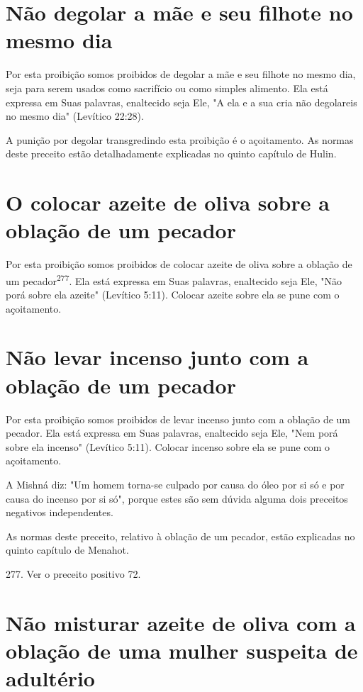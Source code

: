 \begin{itemize}
\begin{enumrate}
\begin{itemize}
\begin{itemize}
\begin{itemize}
\section{Não degolar a mãe e seu filhote no mesmo dia}

Por esta proibição somos proibidos de degolar a mãe e seu filhote no
mesmo dia, seja para serem usados como sacrifício ou como simples
alimento. Ela está expressa em Suas palavras, enaltecido seja Ele, "A
ela e a sua cria não degolareis no mesmo dia" (Levítico 22:28).

A punição por degolar transgredindo esta proibição é o açoitamento. As
normas deste preceito estão detalhadamente explicadas no quin­to
capítulo de Hulin.


\section{O colocar azeite de oliva sobre a oblação de um pecador}

Por esta proibição somos proibidos de colocar azeite de oliva sobre a
oblação de um pecador\textsuperscript{277}. Ela está expressa em Suas
palavras, enaltecido se­ja Ele, "Não porá sobre ela azeite" (Levítico
5:11). Colocar azeite sobre ela se pune com o açoitamento.


\section{Não levar incenso junto com a oblação de um pecador}


Por esta proibição somos proibidos de levar incenso junto com a oblação
de um pecador. Ela está expressa em Suas palavras, enaltecido seja Ele,
"Nem porá sobre ela incenso" (Levítico 5:11). Colocar incenso sobre ela
se pu­ne com o açoitamento.

A Mishná diz: "Um homem torna-se culpado por causa do óleo por si só e
por causa do incenso por si só", porque estes são sem dúvida alguma dois
preceitos negativos independentes.

As normas deste preceito, relativo à oblação de um pecador, estão
explicadas no quinto capítulo de Menahot.

277. Ver o preceito positivo 72.


\section{Não misturar azeite de oliva com a oblação de uma mulher suspeita de adultério}


\end{itemize}
\end{itemize}
\end{itemize}
\end{enumrate}
\end{itemize}
